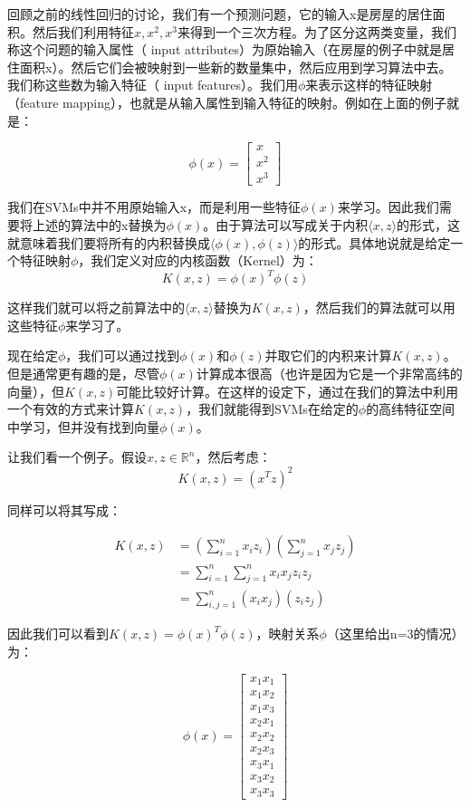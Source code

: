 \documentclass[UTF8]{ctexart}
\begin{document}
回顾之前的线性回归的讨论，我们有一个预测问题，它的输入x是房屋的居住面积。然后我们利用特征$x,x^{2},x^{3}$来得到一个三次方程。为了区分这两类变量，我们称这个问题的输入属性（ input attributes）为原始输入（在房屋的例子中就是居住面积x）。然后它们会被映射到一些新的数量集中，然后应用到学习算法中去。我们称这些数为输入特征（ input features）。我们用$\phi$来表示这样的特征映射（feature mapping），也就是从输入属性到输入特征的映射。例如在上面的例子就是：

\[ \phi(x) = \begin{bmatrix}  x \\ x^{2} \\ x^{3} \end{bmatrix} \]

我们在SVMs中并不用原始输入x，而是利用一些特征$\phi(x)$来学习。因此我们需要将上述的算法中的x替换为$\phi(x)$。由于算法可以写成关于内积$\langle x,z \rangle$的形式，这就意味着我们要将所有的内积替换成$\langle \phi(x),\phi(z) \rangle$的形式。具体地说就是给定一个特征映射$\phi$，我们定义对应的内核函数（Kernel）为：
\[ K(x,z) = \phi(x)^{T} \phi(z) \]

这样我们就可以将之前算法中的$\langle x,z \rangle$替换为$ K(x,z) $，然后我们的算法就可以用这些特征$\phi$来学习了。

现在给定$\phi$，我们可以通过找到$\phi(x)$和$\phi(z)$并取它们的内积来计算$ K(x,z) $。但是通常更有趣的是，尽管$\phi(x)$计算成本很高（也许是因为它是一个非常高纬的向量），但$ K(x,z) $可能比较好计算。在这样的设定下，通过在我们的算法中利用一个有效的方式来计算$ K(x,z) $，我们就能得到SVMs在给定的$\phi$的高纬特征空间中学习，但并没有找到向量$\phi(x)$。

让我们看一个例子。假设$x,z\in \mathbb{R}^{n}$，然后考虑：\[K(x,z) = (x^{T}z)^{2} \]

同样可以将其写成：

\begin{align*}
K(x,z) & = (\sum_{i=1}^{n}x_{i}z_{i})(\sum_{j=1}^{n}x_{j}z_{j}) \\
& = \sum_{i=1}^{n}\sum_{j=1}^{n}x_{i}x_{j}z_{i}z_{j}\\
& = \sum_{i,j=1}^{n} (x_{i}x_{j})(z_{i}z_{j})
\end{align*}


因此我们可以看到$K(x,z) = \phi(x)^{T} \phi(z)$，映射关系$\phi$（这里给出n=3的情况）为：

\[\phi(x) = \begin{bmatrix} x_{1}x_{1}\\  x_{1}x_{2}\\ x_{1}x_{3}\\ x_{2}x_{1}\\  x_{2}x_{2}\\ x_{2}x_{3}\\x_{3}x_{1}\\  x_{3}x_{2}\\ x_{3}x_{3}\end{bmatrix} \]
\end{document}
